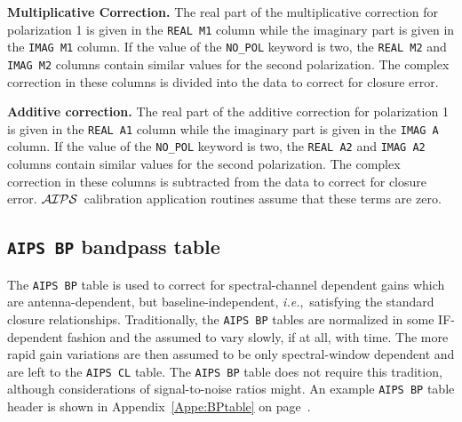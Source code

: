 \documentclass[twoside]{article}
\newcommand{\AIPS}{{$\cal AIPS\/$}}
\newcommand{\ie}{{\it i.e.},}
\begin{document}
{\bf Multiplicative Correction.}  The real part of the multiplicative
correction for polarization 1 is given in the {\tt REAL M1} column
while the imaginary part is given in the {\tt IMAG M1} column.  If the
value of the {\tt NO\_POL} keyword is two, the {\tt REAL M2} and {\tt
  IMAG M2} columns contain similar values for the second polarization.
The complex correction in these columns is divided into the data to
correct for closure error.

{\bf Additive correction.}  The real part of the additive correction
for polarization 1 is given in the {\tt REAL A1} column while the
imaginary  part is given in the {\tt IMAG A} column.  If the value of
the {\tt NO\_POL} keyword is two, the {\tt REAL A2} and {\tt IMAG A2}
columns contain similar values for the second polarization.  The
complex correction in these columns is subtracted from the data to
correct for closure error.  \AIPS\ calibration application routines
assume that these terms are zero.

\subsection{{\tt AIPS BP} bandpass table}
\label{s:BP}

The {\tt AIPS BP} table is used to correct for spectral-channel
dependent gains which are antenna-dependent, but baseline-independent,
\ie\ satisfying the standard closure relationships.  Traditionally, the
{\tt AIPS BP} tables are normalized in some IF-dependent fashion and
the assumed to vary slowly, if at all, with time.  The more rapid gain
variations are then assumed to be only spectral-window dependent and
are left to the {\tt AIPS CL} table.  The {\tt AIPS BP} table does not
require this tradition, although considerations of signal-to-noise
ratios might.  An example {\tt AIPS BP} table header is shown in
Appendix~\ref{Appe:BPtable} on page~\pageref{Appe:BPtable}.
\end{document}
